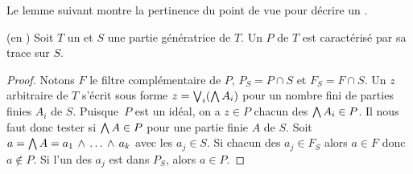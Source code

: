 \smallskip Le lemme suivant montre la pertinence du point de vue  pour décrire un \trdi.
\begin{lemma} \label{lemidepsurGen} (en \clama)
Soit $T$ un \trdi et $S$ une partie génératrice de $T$. Un \idep $P$ de $T$
est caractérisé par sa trace sur $S$. 
\end{lemma}
%
\begin{proof}
Notons $F$ le filtre complémentaire de $P$, $P_S=P\cap S$ et $F_S=F\cap S$.
Un \elt $z$ arbitraire de $T$ s'écrit sous forme $z=\bigvee_i(\bigwedge A_i)$ pour un nombre fini de parties finies $A_i$ de $S$. 
Puisque~$P$ est un idéal, on a $z\in P$ \ssi chacun des $\bigwedge A_i\in P$.
Il nous faut donc tester si  $\bigwedge A\in P$ pour une partie finie $A$ de $S$.
Soit $a=\bigwedge A=a_1\,\wedge\, \dots \,\wedge\, a_k$ avec les $a_j\in S$. Si chacun des $a_j\in F_S$ alors $a\in F$ donc $a\notin P$. Si l'un des $a_j$ est dans $P_S$, alors $a\in P$. 
\end{proof}
%



